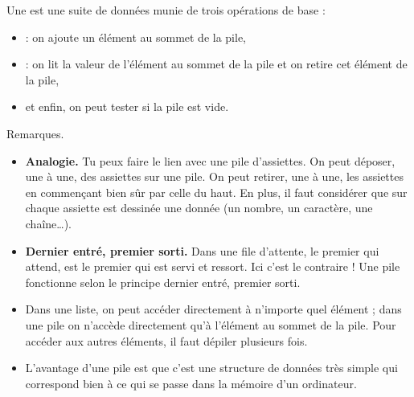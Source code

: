 \documentclass[11pt,class=report,crop=false]{standalone}
\begin{document}
\newcommand{\badletter}[1]{\underline{\textcolor{red}{#1}}}






\begin{cours}[Pile]

  Une  est une suite de données munie de trois opérations de base :
  \begin{itemize}
    \item {} : on ajoute un élément au sommet de la pile,
    \item {} : on lit la valeur de l'élément au sommet de la pile et on retire cet élément de la pile,
    \item et enfin, on peut tester si la pile est vide.
  \end{itemize}  



Remarques.
\begin{itemize}
  \item \textbf{Analogie.} Tu peux faire le lien avec une pile d'assiettes. On peut déposer, une à une, des assiettes sur une pile. On peut retirer, une à une, les assiettes en commençant bien sûr par celle du haut. En plus, il faut considérer que sur chaque assiette est dessinée une donnée (un nombre, un caractère, une chaîne\ldots).

  \item \textbf{Dernier entré, premier sorti.} 
  Dans une file d'attente, le premier qui attend, est le premier qui est servi et ressort. Ici  c'est le contraire ! Une pile fonctionne selon le principe \og{}dernier entré, premier sorti\fg{}.
  
  \item Dans une liste, on peut accéder directement à n'importe quel élément ; dans une pile on n'accède directement  qu'à l'élément au sommet de la pile. Pour accéder aux autres éléments, il faut dépiler plusieurs fois.
  
  \item L'avantage d'une pile est que c'est une structure de données très simple qui correspond bien à ce qui se passe dans la mémoire d'un ordinateur.
\end{itemize}
\end{cours}
\end{document}
